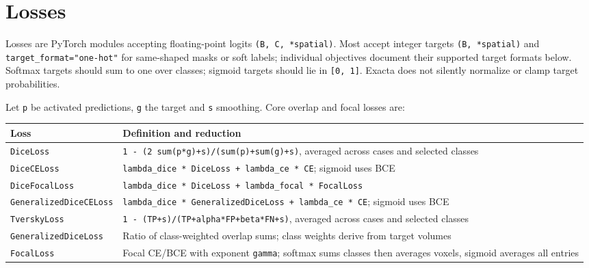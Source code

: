 \chapter{Losses}\label{ch:losses}

Losses are PyTorch modules accepting floating-point logits \texttt{(B,\ C,\ *spatial)}. Most accept integer
targets \texttt{(B,\ *spatial)} and \texttt{target\_format="one-hot"} for same-shaped masks or soft labels;
individual objectives document their supported target formats below.
Softmax targets should sum to one over classes; sigmoid targets should lie in \texttt{{[}0,\ 1{]}}.
Exacta does not silently normalize or clamp target probabilities.

Let \texttt{p} be activated predictions, \texttt{g} the target and \texttt{s} smoothing. Core overlap and focal losses are:

{\small{} %
\begin{longtable}[]{@{}
  >{\raggedright\arraybackslash}p{}
  >{\raggedright\arraybackslash}p{}@{}}
\toprule\noalign{}
\begin{minipage}[b]{\linewidth}\raggedright
Loss
\end{minipage} & \begin{minipage}[b]{\linewidth}\raggedright
Definition and reduction
\end{minipage} \\
\midrule\noalign{}
\endhead
\bottomrule\noalign{}
\endlastfoot
\texttt{DiceLoss} & \texttt{1\ -\ (2\ sum(p*g)+s)/(sum(p)+sum(g)+s)}, averaged across cases and selected classes \\
\texttt{DiceCELoss} & \texttt{lambda\_dice\ *\ DiceLoss\ +\ lambda\_ce\ *\ CE}; sigmoid uses BCE \\
\texttt{DiceFocalLoss} & \texttt{lambda\_dice\ *\ DiceLoss\ +\ lambda\_focal\ *\ FocalLoss} \\
\texttt{GeneralizedDiceCELoss} & \texttt{lambda\_dice\ *\ GeneralizedDiceLoss\ +\ lambda\_ce\ *\ CE}; sigmoid uses BCE \\
\texttt{TverskyLoss} & \texttt{1\ -\ (TP+s)/(TP+alpha*FP+beta*FN+s)}, averaged across cases and selected classes \\
\texttt{GeneralizedDiceLoss} & Ratio of class-weighted overlap sums; class weights derive from target volumes \\
\texttt{FocalLoss} & Focal CE/BCE with exponent \texttt{gamma}; softmax sums classes then averages voxels, sigmoid averages all entries \\
\end{longtable}
}

